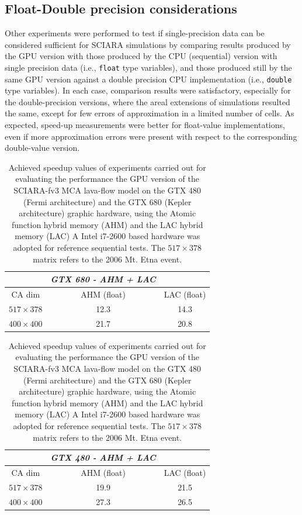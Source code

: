 \subsection{Float-Double precision considerations}\label{sect:precisionConsid}
Other experiments were performed to test if single-precision data can be
considered sufficient for SCIARA simulations by comparing results produced by the GPU
version with those produced by the CPU (sequential) version with single
precision data (i.e., \verb"float" type variables), and those produced still by
the same GPU version against a double precision CPU implementation (i.e.,
\verb"double" type variables). In each case, comparison results were
satisfactory, especially for the double-precision versions, where the areal
extensions of simulations resulted the same, except for few errors of
approximation in a limited number of cells. As expected, speed-up measurements
were better for float-value implementations, even if more approximation errors
were present with respect to the corresponding double-value version.

{\footnotesize
\begin{table}
\caption{Achieved speedup values of experiments carried out for evaluating the
performance the GPU version of the SCIARA-fv3 MCA lava-flow model on the GTX
480 (Fermi architecture) and the GTX 680 (Kepler architecture) graphic hardware,
using the Atomic function hybrid  memory (AHM) and the LAC hybrid memory (LAC)
A Intel i7-2600 based hardware was adopted for reference sequential tests.
The $517 \times 378$ matrix refers to the 2006 Mt. Etna
event.}\label{tab:execAHM_LAC} \center
\begin{center}

\begin{tabular}{ccc}
&  \textit{GTX 680 - AHM + LAC} & \\
\hline
CA dim &   AHM (float) &  LAC (float)  \\
\hline
$517 \times 378$ & 12.3 & 14.3  \\
$400 \times 400 $ & 21.7 & 20.8  \\

\hline
\end{tabular}

\vspace{10pt}

\begin{tabular}{ccc}
&  \textit{GTX 480 - AHM + LAC} & \\
\hline
CA dim &   AHM (float) &  LAC (float)  \\
\hline
$517 \times 378$ & 19.9 & 21.5  \\
$400 \times 400 $ & 27.3 & 26.5  \\

\hline
\end{tabular}


\end{center}
\end{table}
}


